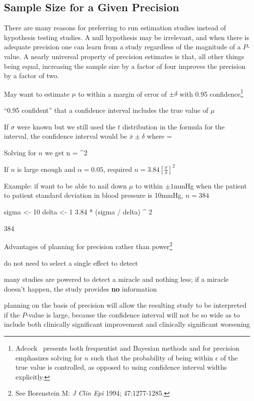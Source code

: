 \subsection{Sample Size for a Given Precision} 
There are many reasons for preferring to run estimation studies
instead of hypothesis testing studies.  A null hypothesis may be
irrelevant, and when there is adequate precision one can learn from a
study regardless of the magnitude of a $P$-value.  A nearly universal
property of precision estimates is that, all other things being equal,
increasing the sample size by a factor of four improves the precision
by a factor of two.
\bi
\item May want to estimate $\mu$ to within a margin of error of $\pm
  \delta$ with 0.95 confidence\footnote{Adcock~\cite{adc97sam}
    presents both frequentist and Bayesian methods and for precision
    emphasizes solving for $n$ such that the probability of being
    within $\epsilon$ of the true value is controlled, as opposed to
    using confidence interval widths explicitly.}
\item ``0.95 confident'' that a confidence interval includes the true
  value of $\mu$
\item If $\sigma$ were known but we still used the $t$ distribution in
  the formula for the interval, the confidence interval would be
  $\bar{x}\pm \delta$ where
\beq
\delta = 
\eeq
\item Solving for $n$ we get
\beq
n = ^{2}
\eeq
\item If $n$ is large enough and $\alpha=0.05$, required
  $n=3.84[\frac{\sigma}{\delta}]^{2}$
\item Example: if want to be able to nail down $\mu$ to within $\pm
  1$mmHg when the patient to patient standard deviation in blood
  pressure is 10mmHg, $n = 384$
\begin{Schunk}
\begin{Sinput}
sigma <- 10
delta <- 1
3.84 * (sigma / delta) ^ 2
\end{Sinput}
\begin{Soutput}
[1] 384
\end{Soutput}
\end{Schunk}
\item Advantages of planning for precision rather than
  power\footnote{See Borenstein M: \emph{J Clin Epi} 1994;
    47:1277-1285.}
 \bi
 \item do not need to select a single effect to detect
 \item many studies are powered to detect a miracle and nothing less;
   if a miracle doesn't happen, the study provides \textbf{no} information
 \item planning on the basis of precision will allow the resulting
   study to be interpreted if the $P$-value is 
   large, because the confidence interval will not be so wide as to
   include both clinically significant improvement and clinically
   significant worsening
 \ei
\ei

